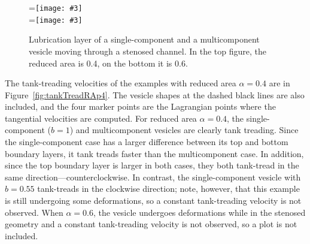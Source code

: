 \documentclass[twoside,twocolumn,9pt]{article}
\newcommand{\subfigimg}[3][,]{%
  \setbox1=\hbox{\texttt{[image: \#3]}}%
  \leavevmode\rlap{\usebox1}%
  \rlap{\hspace*{0pt}\raisebox{\dimexpr\ht1-0\baselineskip}{\bf
  \normalsize #2}}%
  \phantom{\usebox1}%
}
\begin{document}
\begin{figure}[h]
    \centering
    \subfigimg[width = \columnwidth]{(a)}{figures/Fig8a.pdf}\\
    \subfigimg[width = \columnwidth]{(b)}{figures/Fig8b.pdf}
    \caption{\small Lubrication layer of a single-component and a multicomponent vesicle moving through a stenosed channel. In the top figure, the reduced area is 0.4, on the bottom it is 0.6.}
    \label{fig:lubrication}
\end{figure}

The tank-treading velocities of the examples with reduced area $\alpha = 0.4$ are in Figure~\ref{fig:tankTreadRAp4}. The vesicle shapes at the dashed black lines are also included, and the four marker points are the Lagrangian points where the tangential velocities are computed. For reduced area $\alpha = 0.4$, the single-component ($b=1$) and multicomponent vesicles are clearly tank treading. Since the single-component case has a larger difference between its top and bottom boundary layers, it tank treads faster than the multicomponent case. In addition, since the top boundary layer is larger in both cases, they both tank-tread in the same direction---counterclockwise. In contrast, the single-component vesicle with $b=0.55$ tank-treads in the clockwise direction; note, however, that this example is still undergoing some deformations, so a constant tank-treading velocity is not observed. When $\alpha = 0.6$, the vesicle undergoes deformations while in the stenosed geometry and a constant tank-treading velocity is not observed, so a plot is not included. 


\end{document}
